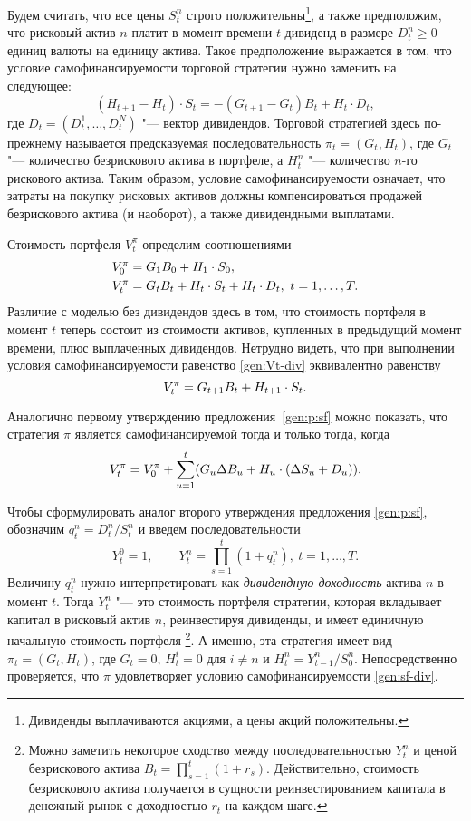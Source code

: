 Будем считать, что все цены $S_t^n$ строго положительны\footnote{Дивиденды выплачиваются акциями, а цены акций положительны.}, а также предположим, что рисковый актив $n$ платит в момент времени $t$ дивиденд в размере $D_t^n\ge 0$ единиц валюты на единицу актива.
Такое предположение выражается в том, что условие самофинансируемости торговой стратегии нужно  заменить на следующее:
\begin{equation}
\label{gen:sf-div}
(H_{t+1} - H_t)\cdot S_t  = -(G_{t+1} - G_t)B_t + H_t\cdot D_t,
\end{equation}
где $D_t = (D_t^1,\dots,D_t^N)$ "--- вектор дивидендов.
Торговой стратегией здесь по-прежнему называется предсказуемая последовательность $\pi_t = (G_t,H_t)$, где $G_t$ "--- количество безрискового актива в портфеле, а $H_t^n$ "--- количество $n$-го рискового актива. Таким образом, условие самофинансируемости означает, что затраты на покупку рисковых активов должны компенсироваться продажей безрискового актива (и наоборот), а также дивидендными выплатами.

Стоимость портфеля $V_t^\pi$ определим соотношениями
\begin{align}
\label{gen:V0-div}
&V_0^\pi = G_1B_0 + {H_1}\cdot{S_0},\\
\label{gen:Vt-div}
&V_t^\pi = G_tB_t + {H_t}\cdot{S_t} + {H_t}\cdot{D_t},\ t=1,\dots,T.
\end{align}
Различие с моделью без дивидендов здесь в том, что стоимость портфеля в момент $t$ теперь состоит из стоимости активов, купленных в предыдущий момент времени, плюс выплаченных дивидендов. Нетрудно видеть, что при выполнении условия самофинансируемости равенство \eqref{gen:Vt-div} эквивалентно равенству
\begin{equation}
\label{gen:Vt-div-sf}
V_t^\pi = G_{t+1}B_t + {H_{t+1}}\cdot{S_t}.
\end{equation}


Аналогично первому утверждению предложения~\ref{gen:p:sf} можно показать, что стратегия $\pi$ является самофинансируемой тогда и только тогда, когда
\[
V_t^\pi = V_0^\pi + \sum_{u=1}^t (G_u\Delta B_u + {H_u}\cdot{(\Delta S_u + D_u)}).
\]

Чтобы сформулировать аналог второго утверждения предложения \ref{gen:p:sf}, обозначим $q_t^n = D_t^n/S_t^n$ и введем последовательности
\begin{equation}
\label{gen:div-yield}  
Y_t^0 = 1, \qquad Y_t^n = \prod_{s=1}^t \left(1+q_t^n\right),\ t=1,\dots,T.
\end{equation}
Величину $q_t^n$ нужно интерпретировать как \emph{дивидендную доходность} актива $n$ в момент $t$. 
Тогда $Y_t^n$ "--- это стоимость портфеля стратегии, которая вкладывает капитал в рисковый актив $n$, реинвестируя дивиденды, и имеет единичную начальную стоимость портфеля%
\footnote{Можно заметить некоторое сходство между последовательностью $Y_t^n$ и ценой безрискового актива $B_t = \prod_{s=1}^t (1+r_s)$. Действительно, стоимость безрискового актива получается в сущности реинвестированием капитала в денежный рынок с доходностью $r_t$ на каждом шаге.}.
А именно, эта стратегия имеет вид $\pi_t=(G_t,H_t)$, где $G_t=0$, $H_t^i = 0$ для $i\neq n$ и $H_t^n = Y_{t-1}^n/S_{0}^n$.
Непосредственно проверяется, что $\pi$ удовлетворяет условию самофинансируемости \eqref{gen:sf-div}.

